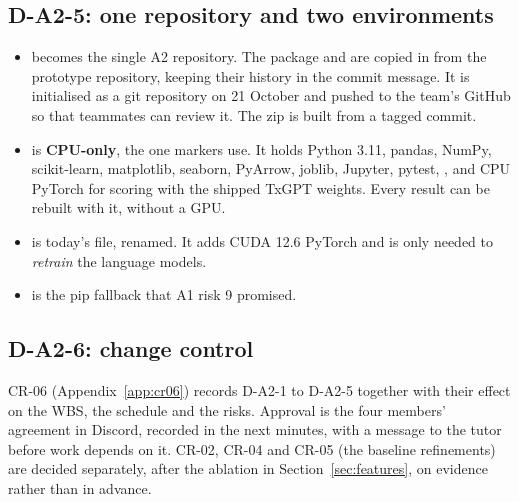 \subsection{D-A2-5: one repository and two environments}
\label{sec:repo}

\begin{itemize}
  \item {} becomes the single A2 repository. The  package and
     are copied in from the prototype repository, keeping their history in
    the commit message. It is initialised as a git repository on 21 October and pushed to the
    team's GitHub so that teammates can review it. The zip is built from a tagged commit.
  \item {} is \textbf{CPU-only}, the one markers use. It holds Python 3.11,
    pandas, NumPy, scikit-learn, matplotlib, seaborn, PyArrow, joblib, Jupyter, pytest,
    , and CPU PyTorch for scoring with the shipped TxGPT weights. Every result
    can be rebuilt with it, without a GPU.
  \item {} is today's file, renamed. It adds CUDA 12.6 PyTorch and is only
    needed to \emph{retrain} the language models.
  \item {} is the pip fallback that A1 risk 9 promised.
\end{itemize}

\subsection{D-A2-6: change control}

CR-06 (Appendix~\ref{app:cr06}) records D-A2-1 to D-A2-5 together with their effect on the WBS,
the schedule and the risks. Approval is the four members' agreement in Discord, recorded in the
next minutes, with a message to the tutor before work depends on it. CR-02, CR-04 and CR-05 (the
baseline refinements) are decided separately, after the ablation in
Section~\ref{sec:features}, on evidence rather than in advance.
